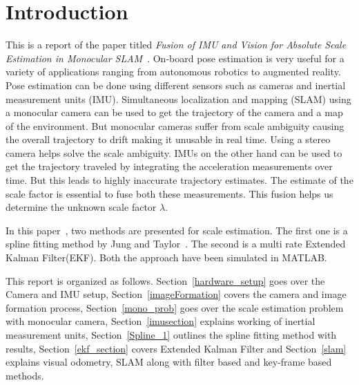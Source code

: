 \section{Introduction}
\label{introduction}

This is a report of the paper titled \emph{Fusion of IMU and Vision for Absolute Scale Estimation in Monocular SLAM}~\cite{nutzi2011fusion}. On-board pose estimation is very useful for a variety of applications ranging from autonomous robotics to augmented reality. Pose estimation can be done using different sensors such as cameras and inertial measurement units (IMU). Simultaneous localization and mapping (SLAM) using a monocular camera can be used to get the trajectory of the camera and a map of the environment. But monocular cameras suffer from scale ambiguity causing the overall trajectory to drift making it unusable in real time. Using a stereo camera helps solve the scale ambiguity. IMUs on the other hand can be used to get the trajectory traveled by integrating the acceleration measurements over time. But this leads to highly inaccurate trajectory estimates. The estimate of the scale factor is essential to fuse both these measurements. This fusion helps us determine the unknown scale factor $\lambda$.    

In this paper~\cite{nutzi2011fusion}, two methods are presented for scale estimation. The first one is a spline fitting method by Jung and Taylor~\cite{jung2001camera}. The second is a multi rate Extended Kalman Filter(EKF). Both the approach have been simulated in MATLAB. 

This report is organized as follows. Section~\ref{hardware_setup} goes over the Camera and IMU setup, Section~\ref{imageFormation} covers the camera and image formation process, Section~\ref{mono_prob} goes over the scale estimation problem with monocular camera, Section~\ref{imusection} explains working of inertial measurement units, Section~\ref{Spline_1} outlines the spline fitting method with results, Section~\ref{ekf_section} covers Extended Kalman Filter and Section~\ref{slam} explains visual odometry, SLAM along with filter based and key-frame based methods.